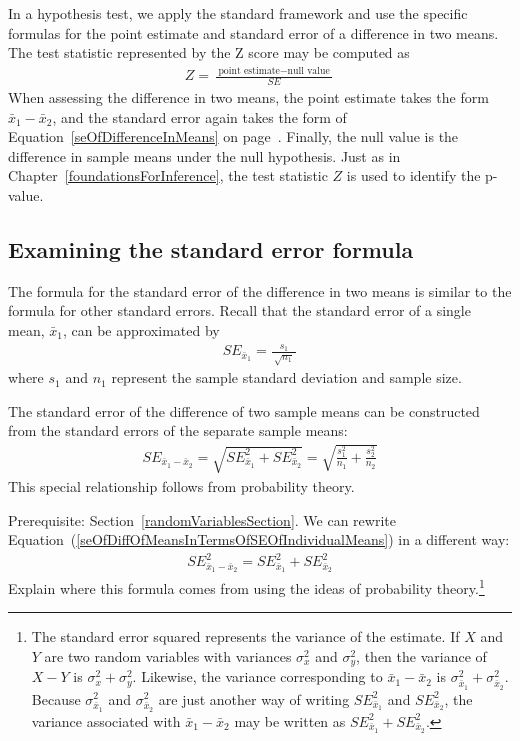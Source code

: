 In a hypothesis test, we apply the standard framework and use the specific formulas for the point estimate and standard error of a difference in two means. The test statistic represented by the Z score may be computed as
\begin{eqnarray*}
Z = \frac{\ \text{point estimate} - \text{null value}\ }{SE}
\end{eqnarray*}
When assessing the difference in two means, the point estimate takes the form $\bar{x}_1 - \bar{x}_2$, and the standard error again takes the form of Equation~\eqref{seOfDifferenceInMeans} on page~\pageref{seOfDifferenceInMeans}. Finally, the null value is the difference in sample means under the null hypothesis. Just as in Chapter~\ref{foundationsForInference}, the test statistic $Z$ is used to identify the p-value.

\subsection{Examining the standard error formula}

The formula for the standard error of the difference in two means is similar to the formula for other standard errors. Recall that the standard error of a single mean, $\bar{x}_1$, can be approximated by
\begin{eqnarray*}
SE_{\bar{x}_1} = \frac{s_1}{\ \sqrt{n_1}\ }
\end{eqnarray*}
where $s_1$ and $n_1$ represent the sample standard deviation and sample size.

The standard error of the difference of two sample means can be constructed from the standard errors of the separate sample means:
\begin{eqnarray}
SE_{\bar{x}_{1} - \bar{x}_{2}}
	= \sqrt{SE_{\bar{x}_1}^2 + SE_{\bar{x}_2}^2}
	= \sqrt{\frac{s_1^2}{{n_1}} + \frac{s_2^2}{{n_2}}}
\label{seOfDiffOfMeansInTermsOfSEOfIndividualMeans}
\end{eqnarray}
This special relationship follows from probability theory.

\begin{exercise}\label{derivingSEForDiffOfTwoMeansExercise}
Prerequisite: Section~\ref{randomVariablesSection}.
We can rewrite Equation~(\ref{seOfDiffOfMeansInTermsOfSEOfIndividualMeans}) in a different way:
\begin{eqnarray*}
SE_{\bar{x}_{1} - \bar{x}_{2}}^2 = SE_{\bar{x}_1}^2 + SE_{\bar{x}_2}^2
\end{eqnarray*}
Explain where this formula comes from using the ideas of probability theory.\footnote{The standard error squared represents the variance of the estimate. If $X$ and $Y$ are two random variables with variances $\sigma_x^2$ and $\sigma_y^2$, then the variance of $X-Y$ is $\sigma_x^2 + \sigma_y^2$. Likewise, the variance corresponding to $\bar{x}_1 - \bar{x}_2$ is $\sigma_{\bar{x}_1}^2 + \sigma_{\bar{x}_2}^2$. Because $\sigma_{\bar{x}_1}^2$ and $\sigma_{\bar{x}_2}^2$ are just another way of writing $SE_{\bar{x}_1}^2$ and  $SE_{\bar{x}_2}^2$, the variance associated with $\bar{x}_1 - \bar{x}_2$ may be written as $SE_{\bar{x}_1}^2 + SE_{\bar{x}_2}^2$.}
\end{exercise}


